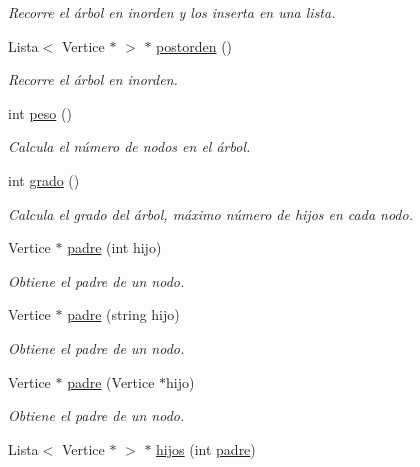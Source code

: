 \begin{DoxyCompactItemize}
\begin{DoxyCompactList}\small\item\em Recorre el árbol en inorden y los inserta en una lista. \end{DoxyCompactList}\item 
\mbox{\label{classArbol_a126e7d801dbe214ac39f183c26e9135d}} 
Lista$<$ Vertice $\ast$ $>$ $\ast$ \hyperlink{classArbol_a126e7d801dbe214ac39f183c26e9135d}{postorden} ()
\begin{DoxyCompactList}\small\item\em Recorre el árbol en inorden. \end{DoxyCompactList}\item 
int \hyperlink{classArbol_a9051a6b4120b42ff8d046f41ab73dbaa}{peso} ()
\begin{DoxyCompactList}\small\item\em Calcula el número de nodos en el árbol. \end{DoxyCompactList}\item 
int \hyperlink{classArbol_a99e608849650b891c34852a81f93d4ab}{grado} ()
\begin{DoxyCompactList}\small\item\em Calcula el grado del árbol, máximo número de hijos en cada nodo. \end{DoxyCompactList}\item 
Vertice $\ast$ \hyperlink{classArbol_abcb8c26e9021a1418de71ad6014351cf}{padre} (int hijo)
\begin{DoxyCompactList}\small\item\em Obtiene el padre de un nodo. \end{DoxyCompactList}\item 
Vertice $\ast$ \hyperlink{classArbol_a53527e7a8999ceda0b8a0fa25a3f357c}{padre} (string hijo)
\begin{DoxyCompactList}\small\item\em Obtiene el padre de un nodo. \end{DoxyCompactList}\item 
Vertice $\ast$ \hyperlink{classArbol_a3395234bc7b7a91d2880e10367039284}{padre} (Vertice $\ast$hijo)
\begin{DoxyCompactList}\small\item\em Obtiene el padre de un nodo. \end{DoxyCompactList}\item 
Lista$<$ Vertice $\ast$ $>$ $\ast$ \hyperlink{classArbol_ac2bfb4e9bab05342fb7d627fe3916183}{hijos} (int \hyperlink{classArbol_abcb8c26e9021a1418de71ad6014351cf}{padre})

\end{DoxyCompactItemize}
